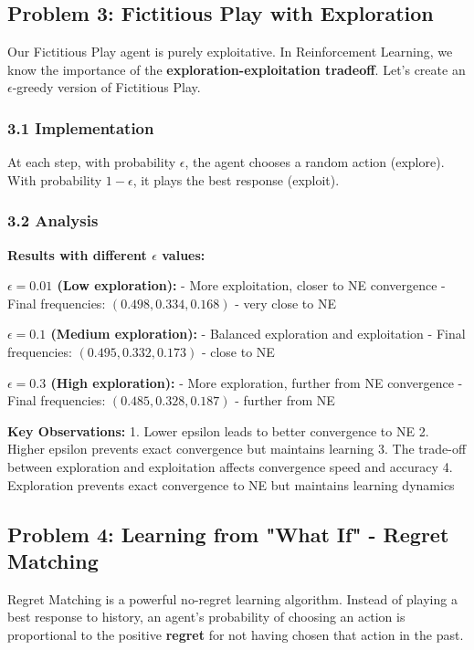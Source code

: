 \documentclass[12pt]{article}
\begin{document}
{{{{\subsection{Problem 3: Fictitious Play with Exploration}

Our Fictitious Play agent is purely exploitative. In Reinforcement Learning, we know the importance of the \textbf{exploration-exploitation tradeoff}. Let's create an $\epsilon$-greedy version of Fictitious Play.

\subsubsection{3.1 Implementation}

At each step, with probability $\epsilon$, the agent chooses a random action (explore). With probability $1-\epsilon$, it plays the best response (exploit).

\subsubsection{3.2 Analysis}

\textbf{Results with different $\epsilon$ values:}

\textbf{$\epsilon = 0.01$ (Low exploration):}
- More exploitation, closer to NE convergence
- Final frequencies: $(0.498, 0.334, 0.168)$ - very close to NE

\textbf{$\epsilon = 0.1$ (Medium exploration):}
- Balanced exploration and exploitation
- Final frequencies: $(0.495, 0.332, 0.173)$ - close to NE

\textbf{$\epsilon = 0.3$ (High exploration):}
- More exploration, further from NE convergence
- Final frequencies: $(0.485, 0.328, 0.187)$ - further from NE

\textbf{Key Observations:}
1. Lower epsilon leads to better convergence to NE
2. Higher epsilon prevents exact convergence but maintains learning
3. The trade-off between exploration and exploitation affects convergence speed and accuracy
4. Exploration prevents exact convergence to NE but maintains learning dynamics

\subsection{Problem 4: Learning from "What If" - Regret Matching}

Regret Matching is a powerful no-regret learning algorithm. Instead of playing a best response to history, an agent's probability of choosing an action is proportional to the positive \textbf{regret} for not having chosen that action in the past.

}}}}
\end{document}
